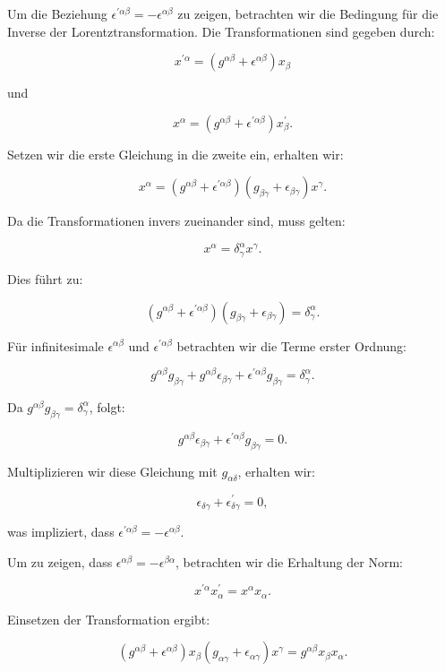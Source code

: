 Um die Beziehung $\epsilon^{\prime \alpha \beta} = - \epsilon^{\alpha \beta}$ zu zeigen, betrachten wir die Bedingung für die Inverse der Lorentztransformation. Die Transformationen sind gegeben durch:

\[
x^{\prime \alpha} = \left(g^{\alpha \beta} + \epsilon^{\alpha \beta}\right) x_\beta
\]

und

\[
x^\alpha = \left(g^{\alpha \beta} + \epsilon^{\prime \alpha \beta}\right) x_\beta^{\prime}.
\]

Setzen wir die erste Gleichung in die zweite ein, erhalten wir:

\[
x^\alpha = \left(g^{\alpha \beta} + \epsilon^{\prime \alpha \beta}\right) \left(g_{\beta \gamma} + \epsilon_{\beta \gamma}\right) x^\gamma.
\]

Da die Transformationen invers zueinander sind, muss gelten:

\[
x^\alpha = \delta^\alpha_\gamma x^\gamma.
\]

Dies führt zu:

\[
\left(g^{\alpha \beta} + \epsilon^{\prime \alpha \beta}\right) \left(g_{\beta \gamma} + \epsilon_{\beta \gamma}\right) = \delta^\alpha_\gamma.
\]

Für infinitesimale $\epsilon^{\alpha \beta}$ und $\epsilon^{\prime \alpha \beta}$ betrachten wir die Terme erster Ordnung:

\[
g^{\alpha \beta} g_{\beta \gamma} + g^{\alpha \beta} \epsilon_{\beta \gamma} + \epsilon^{\prime \alpha \beta} g_{\beta \gamma} = \delta^\alpha_\gamma.
\]

Da $g^{\alpha \beta} g_{\beta \gamma} = \delta^\alpha_\gamma$, folgt:

\[
g^{\alpha \beta} \epsilon_{\beta \gamma} + \epsilon^{\prime \alpha \beta} g_{\beta \gamma} = 0.
\]

Multiplizieren wir diese Gleichung mit $g_{\alpha \delta}$, erhalten wir:

\[
\epsilon_{\delta \gamma} + \epsilon^{\prime}_{\delta \gamma} = 0,
\]

was impliziert, dass $\epsilon^{\prime \alpha \beta} = - \epsilon^{\alpha \beta}$.

Um zu zeigen, dass $\epsilon^{\alpha \beta} = -\epsilon^{\beta \alpha}$, betrachten wir die Erhaltung der Norm:

\[
x^{\prime \alpha} x^{\prime}_\alpha = x^\alpha x_\alpha.
\]

Einsetzen der Transformation ergibt:

\[
\left(g^{\alpha \beta} + \epsilon^{\alpha \beta}\right) x_\beta \left(g_{\alpha \gamma} + \epsilon_{\alpha \gamma}\right) x^\gamma = g^{\alpha \beta} x_\beta x_\alpha.
\]

